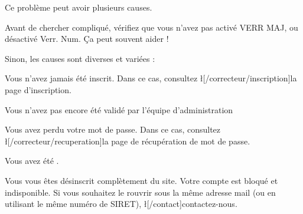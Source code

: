 Ce problème peut avoir plusieurs causes.

Avant de chercher compliqué, vérifiez que vous n'avez pas activé VERR MAJ, ou désactivé Verr. Num. Ça peut souvent aider !

Sinon, les causes sont diverses et variées :
\item Vous n'avez jamais été inscrit. Dans ce cas, consultez \l[/correcteur/inscription]{la page d'inscription}.
\item Vous n'avez pas encore été validé par l'équipe d'administration
\item Vous avez perdu votre mot de passe. Dans ce cas, consultez \l[/correcteur/recuperation]{la page de récupération de mot de passe}.
\item Vous avez été .
\item Vous vous êtes désinscrit complètement du site. Votre compte est bloqué et indisponible. Si vous souhaitez le rouvrir sous la même adresse mail (ou en utilisant le même numéro de SIRET), \l[/contact]{contactez-nous}.
